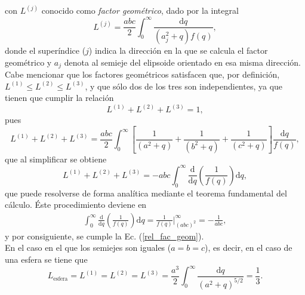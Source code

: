 con $L^{(j)}$ conocido como \textit{factor geométrico}, dado por la integral 
\begin{equation}
    L^{(j)}=\frac{abc}{2}\int_0^{\infty}\frac{\text{d}q}{(a_j^2+q)f(q)},
\end{equation}
donde el superíndice ($j$) indica la dirección en la que se calcula el factor geométrico y $a_j$ denota al semieje del elipsoide orientado en esa misma dirección. Cabe mencionar que los factores geométricos  satisfacen que, por definición, $L^{(1)}\leq L^{(2)}\leq L^{(3)}$, y que sólo dos de los tres son independientes, ya que tienen que cumplir la relación 
\begin{equation}
    L^{(1)}+L^{(2)}+L^{(3)}=1,
    \label{rel_fac_geom}
\end{equation}
pues
\begin{equation*}
	L^{(1)}+L^{(2)}+L^{(3)}=\frac{abc}{2}\int_0^{\infty}\left[\frac{1}{(a^2+q)}+\frac{1}{(b^2+q)}+\frac{1}{(c^2+q)}\right]\frac{\text{d}q}{f(q)},
\end{equation*}
que al simplificar se obtiene
$$L^{(1)}+L^{(2)}+L^{(3)}=-abc\int_0^{\infty}\frac{\text{d}}{\text{d}q}\left(\frac{1}{f(q)}\right)\text{d}q,$$
que puede resolverse de forma analítica mediante el teorema fundamental del cálculo. Éste procedimiento deviene en
\begin{align*}
	\int_0^{\infty}\frac{\text{d}}{\text{d}q}\left(\frac{1}{f(q)}\right)\text{d}q=\frac{1}{f(q)}\Big|_{(abc)^2}^{\infty}=-\frac{1}{abc},
\end{align*}
y por consiguiente, se cumple la Ec. (\ref{rel_fac_geom}).\\

\noindent En el caso en el que los semiejes son iguales ($a=b=c$), es decir, en el caso de una esfera se tiene que
\begin{equation*}
    L_{\text{esfera}}=L^{(1)}=L^{(2)}=L^{(3)}=\frac{a^3}{2}\int_0^{\infty}\frac{\text{d}q}{(a^2+q)^{5/2}}=\frac{1}{3}.
\end{equation*}

